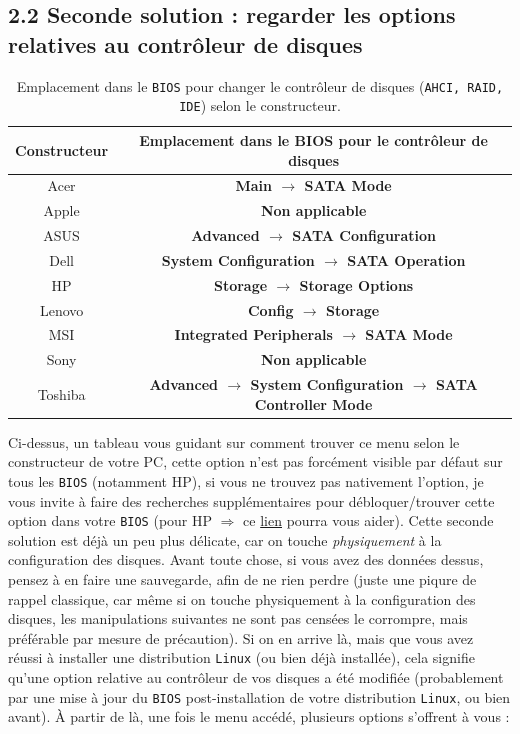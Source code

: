 \documentclass[french, a4paper, 11pt]{article}
\begin{document}
\subsection*{2.2 Seconde solution : regarder les options relatives au contrôleur de disques}
\begin{table}[ht]
    \centering
    \begin{tabular}{|c|>{\bfseries}c|}
        \hline
        \textbf{Constructeur} & \textbf{Emplacement dans le BIOS pour le contrôleur de disques} \\
        \hline
        Acer & Main $\rightarrow$ SATA Mode \\
        Apple & Non applicable \\
        ASUS & Advanced $\rightarrow$ SATA Configuration \\
        Dell & System Configuration $\rightarrow$ SATA Operation \\
        HP & Storage $\rightarrow$ Storage Options \\
        Lenovo & Config $\rightarrow$ Storage \\
        MSI & Integrated Peripherals $\rightarrow$ SATA Mode \\
        Sony & Non applicable \\
        Toshiba & Advanced $\rightarrow$ System Configuration $\rightarrow$ SATA Controller Mode \\
        \hline
    \end{tabular}
    \caption{Emplacement dans le \texttt{BIOS} pour changer le contrôleur de disques (\texttt{AHCI, RAID, IDE}) selon le constructeur.}
    \label{tab:sata-controller-location}
\end{table}
\noindent Ci-dessus, un tableau vous guidant sur comment trouver ce menu selon le constructeur de votre PC, cette option n'est pas forcément visible par défaut sur tous les \texttt{BIOS} (notamment HP), si vous ne trouvez pas nativement l'option, je vous invite à faire des recherches supplémentaires pour débloquer/trouver cette option dans votre \texttt{BIOS} (pour HP $\Rightarrow$ ce \href{https://h30434.www3.hp.com/t5/Notebook-Hardware-and-Upgrade-Questions/Cant-enable-AHCI-controller-mode-in-BIOS/td-p/7827723}{\color{blue} lien} pourra vous aider). Cette seconde solution est déjà un peu plus délicate, car on touche \textit{physiquement} à la configuration des disques. Avant toute chose, si vous avez des données dessus, pensez à en faire une sauvegarde, afin de ne rien perdre (juste une piqure de rappel classique, car même si on touche physiquement à la configuration des disques, les manipulations suivantes ne sont pas censées le corrompre, mais préférable par mesure de précaution). Si on en arrive là, mais que vous avez réussi à installer une distribution \texttt{Linux} (ou bien déjà installée), cela signifie qu'une option relative au contrôleur de vos disques a été modifiée (probablement par une mise à jour du \texttt{BIOS} post-installation de votre distribution \texttt{Linux}, ou bien avant). À partir de là, une fois le menu accédé, plusieurs options s'offrent à vous : 
\end{document}
